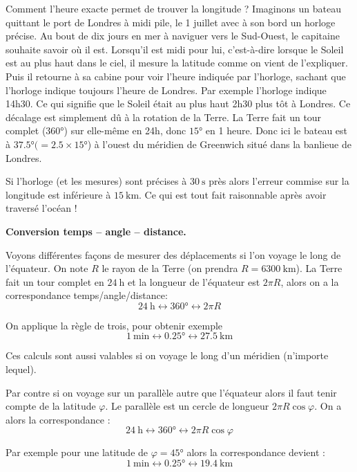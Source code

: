 \documentclass[class=report,crop=false]{standalone}
\begin{document}
Comment l'heure exacte permet de trouver la longitude ?
Imaginons un bateau quittant le port de Londres à midi pile, le 1 juillet
avec à son bord un horloge précise. Au bout de dix jours en mer à naviguer 
vers le Sud-Ouest, le capitaine souhaite savoir où il est. Lorsqu'il est midi pour lui, c'est-à-dire 
lorsque le Soleil est au plus haut dans le ciel, il mesure la latitude 
comme on vient de l'expliquer. Puis il retourne à sa cabine pour voir l'heure indiquée par l'horloge,
sachant que l'horloge indique toujours l'heure de Londres.
Par exemple l'horloge indique 14h30. Ce qui signifie que le Soleil était au plus haut 2h30 plus tôt à Londres.
Ce décalage est simplement dû à la rotation de la Terre. La Terre fait un tour
complet ($\ang{360}$) sur elle-même en 24h, donc $\ang{15}$ en 1 heure.
Donc ici le bateau est à $\ang{37,5} (= \num{2.5} \times \ang{15}$) à l'ouest du méridien de Greenwich situé
dans la banlieue de Londres.


Si l'horloge (et les mesures) sont précises à $\SI{30}{\second}$ près alors l'erreur commise 
sur la longitude est inférieure à $\SI{15}{\kilo\meter}$. Ce qui est tout fait raisonnable 
après avoir traversé l'océan !


\bigskip

\textbf{Conversion temps -- angle -- distance.}

Voyons différentes façons de mesurer des déplacements si l'on voyage le long de l'équateur.
On note $R$ le rayon de la Terre (on prendra $R = \SI{6300}{\kilo\meter}$). La Terre fait un tour complet en $\SI{24}{\hour}$ et la longueur de l'équateur est $2\pi R$, alors on a la correspondance temps/angle/distance:
$$\SI{24}{\hour}\longleftrightarrow\ang{360}\longleftrightarrow 2\pi R$$

On applique la règle de trois, pour obtenir exemple 
$$\SI{1}{\minute}\longleftrightarrow\ang{0.25}\longleftrightarrow \SI{27.5}{\kilo\meter}$$

Ces calculs sont aussi valables si on voyage le long d'un méridien (n'importe lequel).

Par contre si on voyage sur un parallèle autre que l'équateur alors il faut tenir compte de la latitude $\varphi$. Le parallèle est un cercle de longueur $2\pi R \cos \varphi$.
On a alors la correspondance :
$$\SI{24}{\hour}\longleftrightarrow\ang{360}\longleftrightarrow 2\pi R\cos \varphi$$

Par exemple pour une latitude de $\varphi = \ang{45}$ alors la correspondance devient :
$$\SI{1}{\minute}\longleftrightarrow\ang{0.25}\longleftrightarrow \SI{19.4}{\kilo\meter}$$
\end{document}
